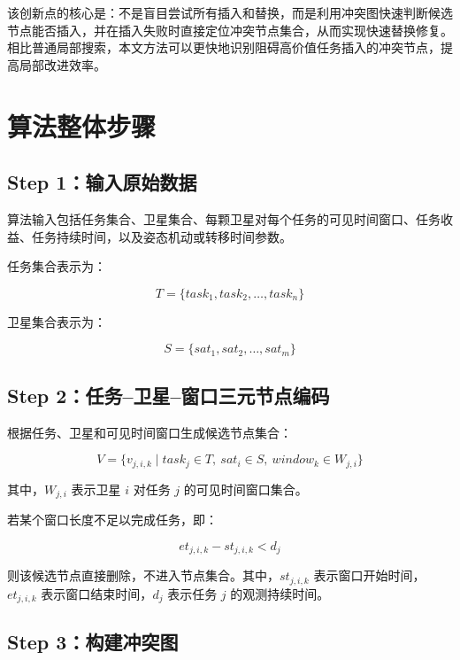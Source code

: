 \documentclass[UTF8,a4paper,12pt]{ctexart}
\begin{document}
该创新点的核心是：不是盲目尝试所有插入和替换，而是利用冲突图快速判断候选节点能否插入，并在插入失败时直接定位冲突节点集合，从而实现快速替换修复。相比普通局部搜索，本文方法可以更快地识别阻碍高价值任务插入的冲突节点，提高局部改进效率。

\newpage

\section{算法整体步骤}

\subsection{Step 1：输入原始数据}

算法输入包括任务集合、卫星集合、每颗卫星对每个任务的可见时间窗口、任务收益、任务持续时间，以及姿态机动或转移时间参数。

任务集合表示为：

\begin{equation}
T=\{task_1,task_2,\dots,task_n\}
\end{equation}

卫星集合表示为：

\begin{equation}
S=\{sat_1,sat_2,\dots,sat_m\}
\end{equation}

\subsection{Step 2：任务--卫星--窗口三元节点编码}

根据任务、卫星和可见时间窗口生成候选节点集合：

\begin{equation}
V=\{v_{j,i,k}\mid task_j\in T,\ sat_i\in S,\ window_k\in W_{j,i}\}
\end{equation}

其中，$W_{j,i}$ 表示卫星 $i$ 对任务 $j$ 的可见时间窗口集合。

若某个窗口长度不足以完成任务，即：

\begin{equation}
et_{j,i,k}-st_{j,i,k}<d_j
\end{equation}

则该候选节点直接删除，不进入节点集合。其中，$st_{j,i,k}$ 表示窗口开始时间，$et_{j,i,k}$ 表示窗口结束时间，$d_j$ 表示任务 $j$ 的观测持续时间。

\subsection{Step 3：构建冲突图}
\end{document}

